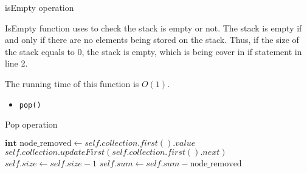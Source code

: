 \documentclass{article}
\begin{document}
	
	\begin{algorithm}[H]
		\caption{isEmpty operation}
		\label{isEmpty}
	\begin{algorithmic}[1]
			\State {} 
		\EndIf{}
		\State  {} 
		\EndFunction{}
	\end{algorithmic}		
	\end{algorithm}

	IsEmpty function uses to check the stack is empty or not. The stack is empty if and only if there are no elements being stored on the stack. Thus, if the size of the stack equals to 0, the stack is empty, which is being cover in if statement in line 2.

	The running time of this function is \(O(1)\).

	\begin{itemize}
		\item \verb|pop()|
	\end{itemize}

	\begin{algorithm}[H]
		\caption{Pop operation}
		\label{pop}
	\begin{algorithmic}[1]
			\State {} 
		\EndIf{}
		\State \(\textbf{int } \text{node\_removed} \gets self.collection.first().value\)
		\State \(self.collection.updateFirst(self.collection.first().next)\)
		\State \(self.size \gets self.size - 1\)
		\State \(self.sum \gets self.sum - \text{node\_removed}\)
		\State {}
		\EndFunction{}
	\end{algorithmic}		
	\end{algorithm}
\end{document}

